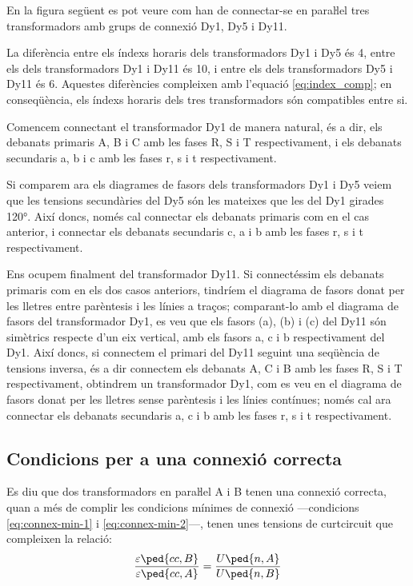 \begin{exemple}[\ConnexParalDifIndex{}]
	\addcontentsxms{\ConnexParalDifIndex}
    En la figura següent es pot veure com han de connectar-se en paraŀlel tres transformadors amb grups de connexió Dy1, Dy5 i Dy11.

	 \begin{center}
		
	\end{center}

      La diferència entre els índexs horaris dels transformadors Dy1 i Dy5 és 4, entre els dels transformadors Dy1 i Dy11 és 10, i entre els dels transformadors Dy5 i Dy11 és 6. Aquestes diferències compleixen amb l'equació \eqref{eq:index_comp}; en conseqüència, els índexs horaris dels tres transformadors són compatibles entre si.


    Comencem connectant el  transformador Dy1 de manera natural, és a dir, els debanats primaris A, B i C amb les fases R, S i T respectivament, i els debanats secundaris a, b i c amb les fases r, s i t respectivament.

  

    Si comparem ara els diagrames de fasors dels transformadors Dy1 i Dy5 veiem que les tensions secundàries del Dy5 són les mateixes que les del Dy1 girades \ang{120}. Així doncs, només  cal connectar els debanats primaris com en el cas anterior, i connectar els debanats secundaris c, a i b amb les fases r, s i t respectivament.


    Ens ocupem finalment del transformador Dy11. Si connectéssim els debanats primaris com en els dos casos anteriors, tindríem el diagrama de fasors donat per les lletres entre parèntesis i les línies a traços; comparant-lo amb el diagrama de fasors del transformador Dy1, es veu que els fasors (a), (b) i (c) del Dy11 són simètrics respecte d'un eix vertical, amb els fasors a, c i b respectivament del Dy1. Així doncs, si connectem el primari del Dy11 seguint una seqüència de tensions inversa, és a dir connectem els debanats A, C i B amb les fases R, S i T respectivament, obtindrem un transformador Dy1, com es veu en el diagrama de fasors donat per les lletres sense parèntesis i les línies contínues; només cal ara connectar els debanats secundaris a, c i b amb les fases r, s i t respectivament.
\end{exemple}

\subsection{Condicions per a una connexió correcta}\label{sec:connex-correcta}
 Es diu que dos transformadors en paraŀlel  A i B tenen una connexió correcta, quan a més de complir les condicions mínimes de connexió ---condicions \eqref{eq:connex-min-1} i \eqref{eq:connex-min-2}---, tenen unes tensions de curtcircuit que compleixen la relació:
\begin{equation}
    \frac{\varepsilon\ped{cc,B}}{\varepsilon\ped{cc,A}} = \frac{U\ped{n,A}}{U\ped{n,B}}\label{eq:connex-correcta}
\end{equation}

